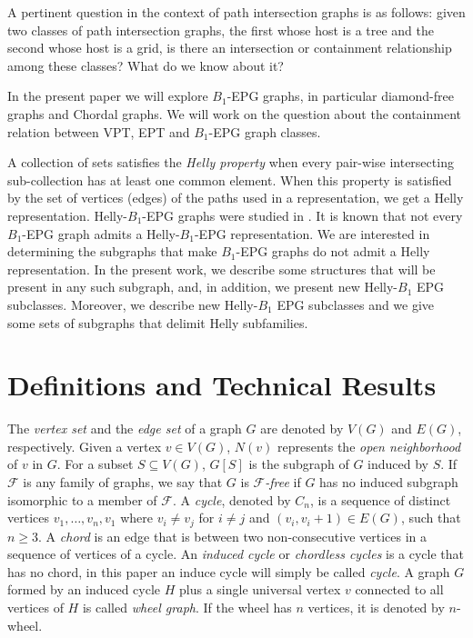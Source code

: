 \documentclass{dmgt}
\begin{document}
 A pertinent question in the context of path intersection graphs is as follows: given two classes of path intersection graphs,
 the first whose host is a tree and the second whose host is a grid,  is there an intersection or containment relationship among these classes? What do we know about it?

In the present paper we will explore $B_1$-EPG graphs, in particular diamond-free graphs and Chordal graphs. We will work on the question about the containment
relation between  VPT, EPT and $B_1$-EPG graph classes.


 A collection  of sets satisfies the \textit{Helly property} when every pair-wise intersecting sub-collection  has at least one common element. When this property
 is satisfied by the set of vertices (edges) of the paths used in a representation, we get a Helly representation.  Helly-$B_1$-EPG graphs were studied
 in \cite{dmtcs:6506}.                                     
It is known that not every $B_1$-EPG graph admits a Helly-$B_1$-EPG representation. We are interested in determining the subgraphs that make
$B_1$-EPG graphs do not admit a Helly representation. In the present work, we describe some structures that will be present in any such subgraph,
and, in addition, we present new  Helly-$B_1$ EPG  subclasses.
Moreover,  we  describe new  Helly-$B_1$ EPG  subclasses %
and we give some sets of subgraphs that delimit Helly subfamilies.   

\section{Definitions and Technical Results}


The \textit{vertex set} and the \textit{edge set} of a graph $G$ are denoted by $V(G)$ and $E(G)$, respectively.  Given a vertex $v\in V(G)$,  $N(v)$  represents the \textit{open
 neighborhood} of $v$ in $G$. 
For a subset $S \subseteq V(G)$,  $G[S]$ is the subgraph of $G$ induced by $S$.
 If $\mathcal{F}$ is any family of graphs, we say that  $G$ is  \textit{$\mathcal{F}$-free} if $G$ has no induced subgraph isomorphic to a member of $\mathcal{F}$.
 A \textit{cycle},  denoted by $C_n$,  is a sequence of distinct
vertices $v_1, \dots , v_n, v_1$  where $v_i \neq v_j$ for $i \neq j$ and $(v_i, v_i + 1) \in E(G)$, such that
$n \geq 3$. A \textit{chord} is an edge that is between two non-consecutive vertices in a sequence of vertices of a cycle. An \textit{induced cycle}  or \textit{chordless cycles} is a cycle that has no chord, in this paper an induce cycle will simply be called  \textit{cycle}. A graph $G$ formed by an induced cycle $H$ plus  a single universal vertex $v$ connected to all vertices of $H$
is called \textit{wheel graph}. If the wheel has $n$ vertices, it is denoted by $n$-wheel. 
\end{document}

